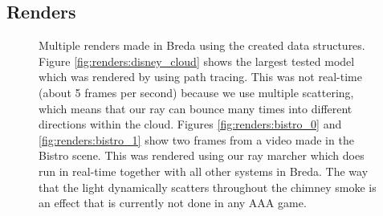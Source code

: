 \subsection{Renders}
\begin{figure}[H]
    \centering
    \hfill
    \hfill

    \hfill

    \caption{Multiple renders made in Breda using the created data structures. Figure \ref{fig:renders:disney_cloud} shows the largest tested model which was rendered by using path tracing. This was not real-time (about 5 frames per second) because we use multiple scattering, which means that our ray can bounce many times into different directions within the cloud. Figures \ref{fig:renders:bistro_0} and \ref{fig:renders:bistro_1} show two frames from a video made in the Bistro scene. This was rendered using our ray marcher which does run in real-time together with all other systems in Breda. The way that the light dynamically scatters throughout the chimney smoke is an effect that is currently not done in any AAA game.} \label{fig:renders}
\end{figure}

